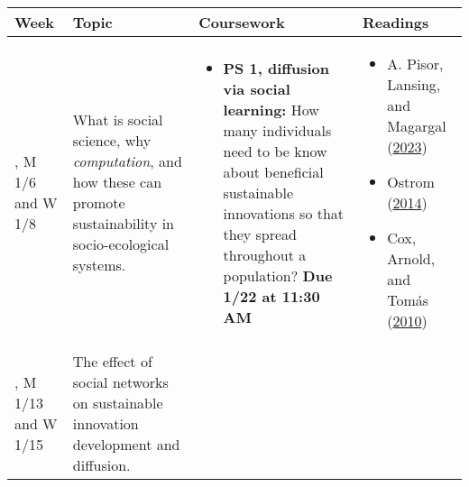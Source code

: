 \documentclass[
]{article}
\providecommand{\tightlist}{%
  \setlength{\itemsep}{0pt}\setlength{\parskip}{0pt}}
\begin{document}
\begin{longtable}[]{@{}
  >{\raggedright\arraybackslash}p{}
  >{\raggedright\arraybackslash}p{}
  >{\raggedright\arraybackslash}p{}
  >{\raggedright\arraybackslash}p{}@{}}
\toprule\noalign{}
\begin{minipage}[b]{\linewidth}\raggedright
Week
\end{minipage} & \begin{minipage}[b]{\linewidth}\raggedright
Topic
\end{minipage} & \begin{minipage}[b]{\linewidth}\raggedright
Coursework
\end{minipage} & \begin{minipage}[b]{\linewidth}\raggedright
Readings
\end{minipage} \\
\midrule\noalign{}
\endhead
\bottomrule\noalign{}
\endlastfoot
1, M 1/6 and W 1/8 & What is social science, why \emph{computation}, and
how these can promote sustainability in socio-ecological systems. &
\begin{minipage}[t]{\linewidth}\raggedright
\begin{itemize}
\tightlist
\item
  \textbf{PS 1, diffusion via social learning:} How many individuals
  need to be know about beneficial sustainable innovations so that they
  spread throughout a population? \textbf{Due 1/22 at 11:30 AM}
\end{itemize}
\end{minipage} & \begin{minipage}[t]{\linewidth}\raggedright
\begin{itemize}
\tightlist
\item
  {A. Pisor, Lansing, and Magargal
  (\hyperref[ref-PisorLansingMagargal2023]{2023})}
\item
  {Ostrom (\hyperref[ref-Ostrom2014]{2014})}
\item
  {Cox, Arnold, and Tomás (\hyperref[ref-Cox2010]{2010})}
\end{itemize}
\end{minipage} \\
2, M 1/13 and W 1/15 & The effect of social networks on sustainable
innovation development and diffusion. & &
\begin{minipage}[t]{\linewidth}\raggedright
\begin{itemize}

\end{itemize}
\end{minipage}
\end{longtable}
\end{document}

